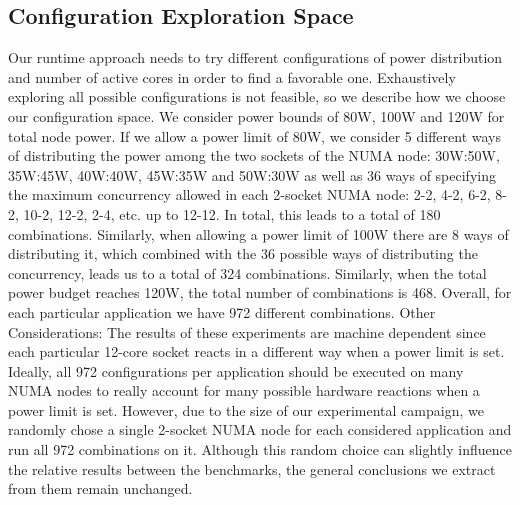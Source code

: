 \subsection{Configuration Exploration Space}
Our runtime approach needs to try different configurations of power distribution and
number of active cores in order to find a favorable one.  Exhaustively exploring all
possible configurations is not feasible, so we describe how we choose our configuration
space.  We consider power bounds of 80W, 100W and 120W for total node power. If we allow a
power limit of 80W, we consider 5 different ways of distributing the power among the two
sockets of the NUMA node: 30W:50W, 35W:45W, 40W:40W, 45W:35W and 50W:30W as well as 36
ways of specifying the maximum concurrency allowed in each 2-socket NUMA node: 2-2, 4-2,
6-2, 8-2, 10-2, 12-2, 2-4, etc.  up to 12-12. In total, this leads to a total of 180
combinations.  Similarly, when allowing a power limit of 100W there are 8 ways of
distributing it, which combined with the 36 possible ways of distributing the concurrency,
leads us to a total of 324 combinations. Similarly, when the total power budget reaches
120W, the total number of combinations is 468. Overall, for each particular application we
have 972 different combinations.  Other Considerations: The results of these experiments
are machine dependent since each particular 12-core socket reacts in a different way when
a power limit is set.  Ideally, all 972 configurations per application should be executed
on many NUMA nodes to really account for many possible hardware reactions when a power
limit is set. However, due to the size of our experimental campaign, we randomly chose a
single 2-socket NUMA node for each considered application and run all 972 combinations on
it. Although this random choice can slightly influence the relative results between the
benchmarks, the general conclusions we extract from them remain unchanged.


